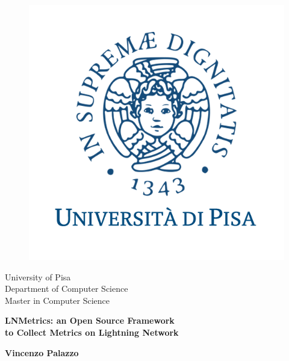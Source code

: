 \begin{titlepage}
\begin{figure}[!htb]
    \centering
    \includegraphics[keepaspectratio=true,scale=0.45]{format/img/unipi.png}
\end{figure}

\begin{center}
    \LARGE{University of Pisa}
    \vspace{5mm}
    \\ \large{Department of Computer Science}
    \vspace{5mm}
    \\ \LARGE{Master in Computer Science}
\end{center}

\vspace{3mm}
\begin{center}
    {\LARGE{\bf LNMetrics: an Open Source Framework\\ \vspace{5mm} to Collect Metrics on Lightning Network }}\\
\end{center}
\vspace{8mm}

\begin{center}
    {\bf \large{Vincenzo Palazzo}\\ {}}
\end{center}


\end{titlepage}
